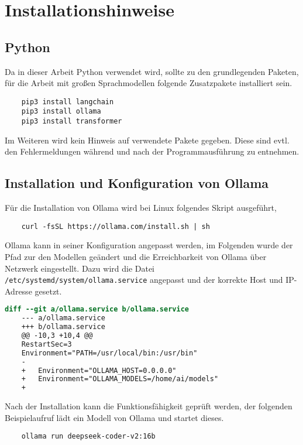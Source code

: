 \section{Installationshinweise}
\subsection{Python}
Da in dieser Arbeit Python verwendet wird, sollte zu den grundlegenden Paketen, für die Arbeit mit großen Sprachmodellen folgende Zusatzpakete installiert sein.

\begin{verbatim}
	pip3 install langchain
	pip3 install ollama
	pip3 install transformer
\end{verbatim}

Im Weiteren wird kein Hinweis auf verwendete Pakete gegeben. Diese sind evtl. den Fehlermeldungen während und nach der Programmausführung zu entnehmen.

\subsection{Installation und Konfiguration von Ollama}\label{sec:install_config_ollama_local}
Für die Installation von Ollama wird bei Linux folgendes Skript ausgeführt,

\begin{verbatim}
	curl -fsSL https://ollama.com/install.sh | sh
\end{verbatim}

Ollama kann in seiner Konfiguration angepasst werden, im Folgenden wurde der Pfad zur den Modellen geändert und die Erreichbarkeit von Ollama über Netzwerk eingestellt. Dazu wird die Datei  \texttt{/etc/systemd/system/ollama.service} angepasst und der korrekte Host und IP-Adresse gesetzt.

\begin{lstlisting}[language=diff,caption={Ollama Hostanpasssng für Netzwerkbetrieb}]
	diff --git a/ollama.service b/ollama.service
	--- a/ollama.service
	+++ b/ollama.service
	@@ -10,3 +10,4 @@
	RestartSec=3
	Environment="PATH=/usr/local/bin:/usr/bin"
	-   
	+   Environment="OLLAMA_HOST=0.0.0.0"
	+   Environment="OLLAMA_MODELS=/home/ai/models"
	+   
\end{lstlisting}

Nach der Installation kann die Funktionsfähigkeit geprüft werden, der folgenden Beispielaufruf lädt ein Modell von Ollama und startet dieses.

\begin{verbatim}
	ollama run deepseek-coder-v2:16b
\end{verbatim}

